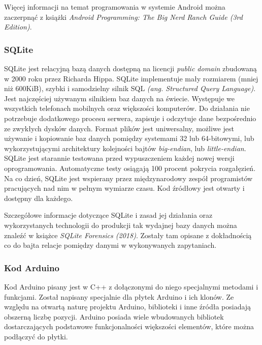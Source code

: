 \documentclass[a4paper,12pt, twoside]{article}
\begin{document}
    	Więcej informacji na temat programowania w systemie Android można zaczerpnąć z książki \textit{Android Programming: The Big Nerd Ranch Guide (3rd Edition)}\cite{androidprogramming}.
    	
    	\subsubsection{SQLite}
    	SQLite jest relacyjną bazą danych dostępną na licencji \textit{public domain}\cite{publicdomain} zbudowaną w 2000 roku przez Richarda Hippa. SQLite implementuje mały rozmiarem (mniej niż 600KiB), szybki i samodzielny  silnik SQL \textit{(ang. Structured Query Language)}. Jest najczęściej używanym silnikiem baz danych na świecie. Występuje we wszystkich telefonach mobilnych oraz większości komputerów. Do działania nie potrzebuje dodatkowego procesu serwera, zapisuje i odczytuje dane bezpośrednio ze zwykłych dysków danych. Format plików jest uniwersalny, możliwe jest używanie i kopiowanie baz danych pomiędzy systemami 32 lub 64-bitowymi, lub wykorzystującymi architektury kolejności bajtów \textit{big-endian}, lub \textit{little-endian}\cite{endian}. SQLite jest starannie testowana przed wypuszczeniem każdej nowej wersji oprogramowania. Automatyczne testy osiągają 100 procent pokrycia rozgałęzień\cite{branchcoverage}. Na co dzień, SQLite jest wspierany przez międzynarodowy zespół programistów pracujących nad nim w pełnym wymiarze czasu. Kod źródłowy jest otwarty i dostępny dla każdego\cite{sqlite}.
    	
    	Szczegółowe informacje dotyczące SQLite i zasad jej działania oraz wykorzystanych technologii do produkcji tak wydajnej bazy danych można znaleźć w książce \textit{SQLite Forensics (2018)}\cite{sqliteforensics}. Zostały tam opisane z dokładnością co do bajta relacje pomiędzy danymi w wykonywanych zapytaniach.
    	
    	\subsubsection{Kod Arduino}
    	Kod Arduino pisany jest w C++ z dołączonymi do niego specjalnymi metodami i funkcjami. Został napisany specjalnie dla płytek Arduino i ich klonów. Ze względu na otwartą naturę projektu Arduino, biblioteki i inne źródła posiadają obszerną liczbę pozycji. Arduino posiada wiele wbudowanych bibliotek dostarczających podstawowe funkcjonalności większości elementów, które można podłączyć do płytki. 
    	
\end{document}
